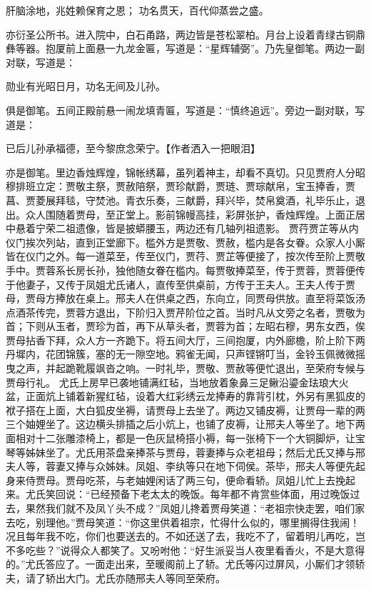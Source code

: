 \documentclass[12pt,oneside]{book}
\begin{document}
肝脑涂地，兆姓赖保育之恩；
功名贯天，百代仰蒸尝之盛。

亦衍圣公所书。进入院中，白石甬路，两边皆是苍松翠柏。月台上设着青绿古铜鼎彝等器。抱厦前上面悬一九龙金匾，写道是：“星辉辅弼”。乃先皇御笔。两边一副对联，写道是：

勋业有光昭日月，功名无间及儿孙。

俱是御笔。五间正殿前悬一闹龙填青匾，写道是：“慎终追远”。旁边一副对联，写道是：

已后儿孙承福德，至今黎庶念荣宁。【作者洒入一把眼泪】

亦是御笔。里边香烛辉煌，锦帐绣幕，虽列着神主，却看不真切。只见贾府人分昭穆排班立定：贾敬主祭，贾赦陪祭，贾珍献爵，贾琏、贾琮献帛，宝玉捧香，贾菖、贾菱展拜毯，守焚池。青衣乐奏，三献爵，拜兴毕，焚帛奠酒，礼毕乐止，退出。众人围随着贾母，至正堂上。影前锦幔高挂，彩屏张护，香烛辉煌。上面正居中悬着宁荣二祖遗像，皆是披蟒腰玉，两边还有几轴列祖遗影。
贾荇贾芷等从内仪门挨次列站，直到正堂廊下。槛外方是贾敬、贾赦，槛内是各女眷。众家人小厮皆在仪门之外。每一道菜至，传至仪门，贾荇、贾芷等便接了，按次传至阶上贾敬手中。贾蓉系长房长孙，独他随女眷在槛内。每贾敬捧菜至，传于贾蓉，贾蓉便传于他妻子，又传于凤姐尤氏诸人，直传至供桌前，方传于王夫人。王夫人传于贾母，贾母方捧放在桌上。邢夫人在供桌之西，东向立，同贾母供放。直至将菜饭汤点酒茶传完，贾蓉方退出，下阶归入贾芹阶位之首。当时凡从文旁之名者，贾敬为首；下则从玉者，贾珍为首，再下从草头者，贾蓉为首；左昭右穆，男东女西，俟贾母拈香下拜，众人方一齐跪下。将五间大厅，三间抱厦，内外廊檐，阶上阶下两丹墀内，花团锦簇，塞的无一隙空地。鸦雀无闻，只声铿锵叮当，金铃玉佩微微摇曳之声，并起跪靴履飒沓之响。一时礼毕，贾敬、贾赦等便忙退出，至荣府专候与贾母行礼。
尤氏上房早已袭地铺满红毡，当地放着象鼻三足鳅沿鎏金珐琅大火盆，正面炕上铺着新猩红毡，设着大红彩绣云龙捧寿的靠背引枕，外另有黑狐皮的袱子搭在上面，大白狐皮坐褥，请贾母上去坐了。两边又铺皮褥，让贾母一辈的两三个妯娌坐了。这边横头排插之后小炕上，也铺了皮褥，让邢夫人等坐了。地下两面相对十二张雕漆椅上，都是一色灰鼠椅搭小褥，每一张椅下一个大铜脚炉，让宝琴等姊妹坐了。尤氏用茶盘亲捧茶与贾母，蓉妻捧与众老祖母；然后尤氏又捧与邢夫人等，蓉妻又捧与众姊妹。凤姐、李纨等只在地下伺侯。茶毕，邢夫人等便先起身来侍贾母。贾母吃茶，与老妯娌闲话了两三句，便命看轿。凤姐儿忙上去挽起来。尤氏笑回说：“已经预备下老太太的晚饭。每年都不肯赏些体面，用过晚饭过去，果然我们就不及凤丫头不成？”凤姐儿搀着贾母笑道：“老祖宗快走罢，咱们家去吃，别理他。”贾母笑道：“你这里供着祖宗，忙得什么似的，哪里搁得住我闹！况且每年我不吃，你们也要送去的。不如还送了去，我吃不了，留着明儿再吃，岂不多吃些？”说得众人都笑了。又吩咐他：“好生派妥当人夜里看香火，不是大意得的。”尤氏答应了。一面走出来，至暖阁前上了轿。尤氏等闪过屏风，小厮们才领轿夫，请了轿出大门。尤氏亦随邢夫人等同至荣府。
\end{document}
